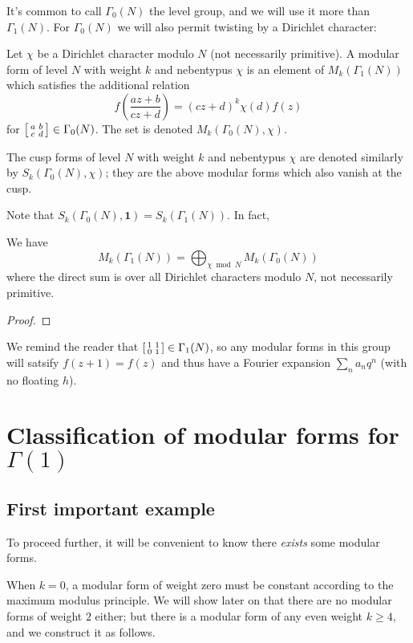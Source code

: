 It's common to call $\Gamma_0(N)$ the \alert{level group},
and we will use it more than $\Gamma_1(N)$.
For $\Gamma_0(N)$ we will also permit twisting by a Dirichlet character:
\begin{definition}
  Let $\chi$ be a Dirichlet character modulo $N$ (not necessarily primitive).
  A \alert{modular form of level $N$ with weight $k$ and nebentypus $\chi$}
  is an element of $M_k(\Gamma_1(N))$ which satisfies the additional relation
  \[ f\left( \frac{az+b}{cz+d} \right)
    = (cz+d)^k \chi(d) f(z)  \]
  for $\begin{bsmallmatrix} a & b \\ c & d \end{bsmallmatrix} \in \Gamma_0(N)$.
  The set is denoted $M_k(\Gamma_0(N), \chi)$.

  The cusp forms of level $N$ with weight $k$ and nebentypus $\chi$
  are denoted similarly by $S_k(\Gamma_0(N), \chi)$;
  they are the above modular forms which also vanish at the cusp.
\end{definition}
Note that $S_k(\Gamma_0(N), \mathbf 1) = S_k(\Gamma_1(N))$.
In fact,
\begin{theorem}
  We have \[ M_k(\Gamma_1(N)) = \bigoplus_{\chi \bmod N} M_k(\Gamma_0(N)) \]
  where the direct sum is over all Dirichlet characters modulo $N$,
  not necessarily primitive.
\end{theorem}
\begin{proof}
\end{proof}

We remind the reader that $\begin{bsmallmatrix} 1 & 1 \\ 0 & 1 \end{bsmallmatrix} \in \Gamma_1(N)$,
so any modular forms in this group will satsify $f(z+1)=f(z)$
and thus have a Fourier expansion $\sum_n a_n q^n$ (with no floating $h$).

\section{Classification of modular forms for $\Gamma(1)$}
\subsection{First important example}
To proceed further, it will be convenient to know
there \emph{exists} some modular forms.

When $k=0$, a modular form of weight zero must be constant
according to the maximum modulus principle.
We will show later on that there are no modular forms of weight $2$ either;
but there is a modular form of any even weight $k \ge 4$,
and we construct it as follows.

